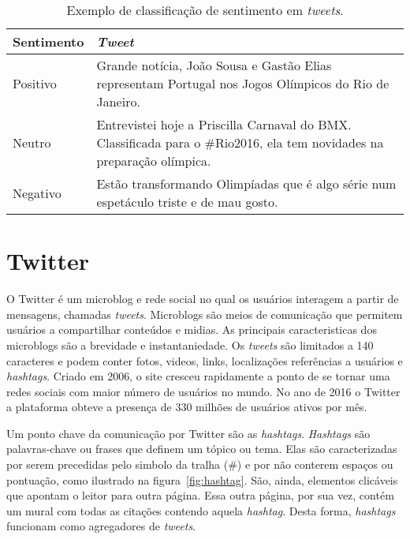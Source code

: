\begin{table}[h]
    \begin{center}
        \begin{tabular}{| l | p{10cm} |}
        \hline
        \textbf{Sentimento} & \textbf{\textit{Tweet}} \\ \hline
        Positivo & Grande notícia, João Sousa e Gastão Elias representam Portugal nos Jogos Olímpicos do Rio de Janeiro.
        \\ \hline
        Neutro & Entrevistei hoje a Priscilla Carnaval do BMX. Classificada para o \#Rio2016, ela tem novidades na
        preparação olímpica. \\ \hline
        Negativo & Estão transformando Olimpíadas que é algo série num espetáculo triste e de mau gosto. \\ \hline
        \end{tabular}
        \caption{Exemplo de classificação de sentimento em \textit{tweets}.}
    \end{center}
    \label{tab:sentiment}
\end{table}


\section{Twitter}

O Twitter é um microblog e rede social no qual os usuários interagem a partir de mensagens, chamadas \textit{tweets}.
Microblogs são meios de comunicação que permitem usuários a compartilhar conteúdos e midias.
As principais caracteristicas dos microblogs são a brevidade e instantaniedade.
Os \textit{tweets} são limitados a 140 caracteres e podem conter fotos, videos, links, localizações referências a
usuários e \textit{hashtags}.
Criado em 2006, o site cresceu rapidamente a ponto de se tornar uma redes sociais com maior número de usuários no mundo.
No ano de 2016 o Twitter a plataforma obteve a presença de 330 milhões de usuários ativos por mês.

Um ponto chave da comunicação por Twitter são as \textit{hashtags}.
\textit{Hashtags} são palavras-chave ou frases que definem um tópico ou tema.
Elas são caracterizadas por serem precedidas pelo simbolo da tralha (\#) e por não conterem espaços ou pontuação, como
ilustrado na figura~\ref{fig:hashtag}.
São, ainda, elementos clicáveis que apontam o leitor para outra página.
Essa outra página, por sua vez, contém um mural com todas as citações contendo aquela \textit{hashtag}.
Desta forma, \textit{hashtags} funcionam como agregadores de \textit{tweets}.

